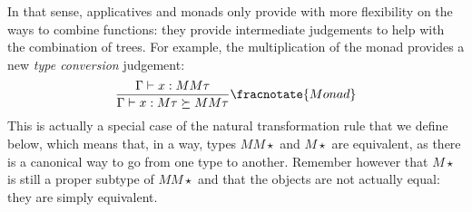\medskip

In that sense, applicatives and monads only provide with more flexibility on
the ways to combine functions:
they provide intermediate judgements to help with the combination of trees.
For example, the multiplication of the monad provides a new
\emph{type conversion} judgement:
\begin{equation*}
	\frac{\Gamma\vdash x: MM\tau}{\Gamma\vdash x: M\tau \succeq MM\tau}
	\fracnotate{Monad}
\end{equation*}
This is actually a special case of the natural transformation rule that we
define below, which means that, in a way, types $MM\star$ and $M\star$ are
equivalent, as there is a canonical way to go from one type to another.
Remember however that $M\star$ is still a proper subtype of $MM\star$ and that
the objects are not actually equal: they are simply equivalent.

